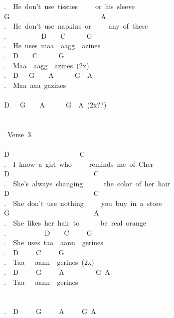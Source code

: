 {.\ \ He\ don't\ use\ tissues\ \ \ \ \ or\ his\ sleeve\\
G\ \ \ \ \ \ \ \ \ \ \ \ \ \ \ \ \ \ \ \ \ \ \ \ \ \ A\\
.\ \ He\ don't\ use\ napkins\ or\ \ \ \ \ any\ of\ these\\
.\ \ \ \ \ \ \ \ \ \ D\ \ \ \ C\ \ \ \ \ \ G\\
.\ \ He\ uses\ maa\ \ aagg\ \ azines\\
.\ \ D\ \ \ \ C\ \ \ \ \ \ G\\
.\ \ Maa\ \ aagg\ \ azines\ (2x)\\
.\ \ D\ \ \ G\ \ \ \ A\ \ \ \ \ \ G\ \ A\\
.\ \ Maa\ aaa\ gazines\\
\\
D\ \ \ G\ \ \ \ A\ \ \ \ \ \ G\ \ A\ (2x??)\\
\\
\\
\lbrack\ Verse\ 3\rbrack\\
\\
D\ \ \ \ \ \ \ \ \ \ \ \ \ \ \ \ \ \ \ \ C\\
.\ \ I\ know\ a\ girl\ who\ \ \ \ \ reminds\ me\ of\ Cher\\
D\ \ \ \ \ \ \ \ \ \ \ \ \ \ \ \ \ \ \ \ \ \ \ \ C\\
.\ \ She's\ always\ changing\ \ \ \ \ \ the\ color\ of\ her\ hair\\
D\ \ \ \ \ \ \ \ \ \ \ \ \ \ \ \ \ \ \ \ \ \ \ \ C\\
.\ \ She\ don't\ use\ nothing\ \ \ \ \ you\ buy\ in\ a\ store\\
G\ \ \ \ \ \ \ \ \ \ \ \ \ \ \ \ \ \ \ \ \ \ \ \ A\\
.\ \ She\ likes\ her\ hair\ to\ \ \ \ \ \ be\ real\ orange\\
.\ \ \ \ \ \ \ \ \ \ \ D\ \ \ \ C\ \ \ \ \ G\\
.\ \ She\ uses\ taa\ \ aann\ \ gerines\\
.\ \ D\ \ \ \ \ C\ \ \ \ \ G\\
.\ \ Taa\ \ \ aann\ \ gerines\ (2x)\\
.\ \ D\ \ \ \ \ G\ \ \ \ \ A\ \ \ \ \ \ \ \ \ G\ A\\
.\ \ Taa\ \ \ aann\ \ gerines\\
\\
\\
.\ \ D\ \ \ \ \ G\ \ \ \ \ A\ \ \ \ \ G\ A}
